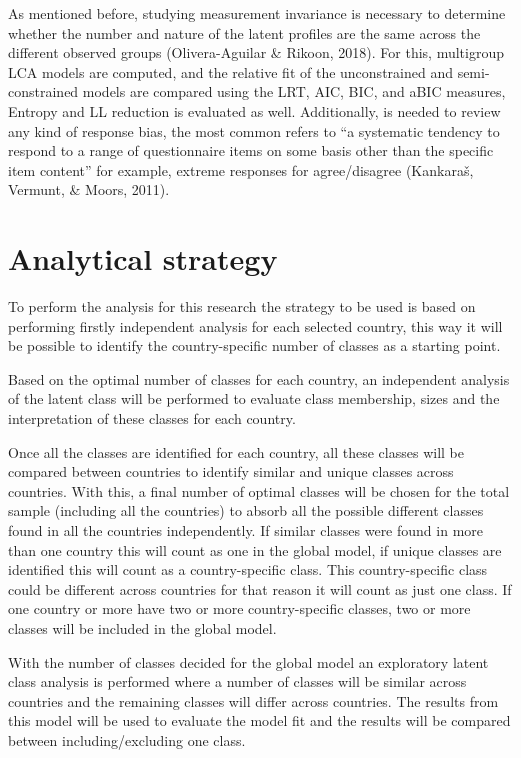 \documentclass[12pt,a4paper,oneside]{reedthesis}
\begin{document}
As mentioned before, studying measurement invariance is necessary to determine whether the number and nature of the latent profiles are the same across the different observed groups (Olivera-Aguilar \& Rikoon, 2018). For this, multigroup LCA models are computed, and the relative fit of the unconstrained and semi-constrained models are compared using the LRT, AIC, BIC, and aBIC measures, Entropy and LL reduction is evaluated as well. Additionally, is needed to review any kind of response bias, the most common refers to ``a systematic tendency to respond to a range of questionnaire items on some basis other than the specific item content'' for example, extreme responses for agree/disagree (Kankaraš, Vermunt, \& Moors, 2011).

\hypertarget{analytical-strategy}{%
\section{Analytical strategy}\label{analytical-strategy}}

To perform the analysis for this research the strategy to be used is based on performing firstly independent analysis for each selected country, this way it will be possible to identify the country-specific number of classes as a starting point.

Based on the optimal number of classes for each country, an independent analysis of the latent class will be performed to evaluate class membership, sizes and the interpretation of these classes for each country.

Once all the classes are identified for each country, all these classes will be compared between countries to identify similar and unique classes across countries. With this, a final number of optimal classes will be chosen for the total sample (including all the countries) to absorb all the possible different classes found in all the countries independently. If similar classes were found in more than one country this will count as one in the global model, if unique classes are identified this will count as a country-specific class. This country-specific class could be different across countries for that reason it will count as just one class. If one country or more have two or more country-specific classes, two or more classes will be included in the global model.

With the number of classes decided for the global model an exploratory latent class analysis is performed where a number of classes will be similar across countries and the remaining classes will differ across countries. The results from this model will be used to evaluate the model fit and the results will be compared between including/excluding one class.
\end{document}
